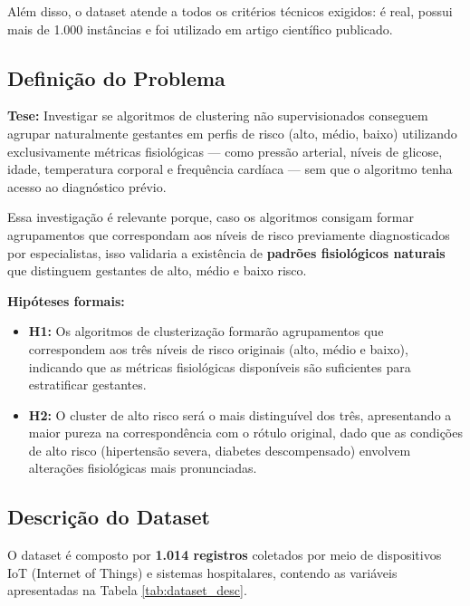 \documentclass[12pt]{article}
\begin{document}
Além disso, o dataset atende a todos os critérios técnicos exigidos: é real, possui mais de 1.000 instâncias e foi utilizado em artigo científico publicado.

\subsection{Definição do Problema}

\textbf{Tese:} Investigar se algoritmos de clustering não supervisionados conseguem agrupar naturalmente gestantes em perfis de risco (alto, médio, baixo) utilizando exclusivamente métricas fisiológicas --- como pressão arterial, níveis de glicose, idade, temperatura corporal e frequência cardíaca --- sem que o algoritmo tenha acesso ao diagnóstico prévio.

Essa investigação é relevante porque, caso os algoritmos consigam formar agrupamentos que correspondam aos níveis de risco previamente diagnosticados por especialistas, isso validaria a existência de \textbf{padrões fisiológicos naturais} que distinguem gestantes de alto, médio e baixo risco.

\textbf{Hipóteses formais:}
\begin{itemize}
    \item \textbf{H1:} Os algoritmos de clusterização formarão agrupamentos que correspondem aos três níveis de risco originais (alto, médio e baixo), indicando que as métricas fisiológicas disponíveis são suficientes para estratificar gestantes.
    \item \textbf{H2:} O cluster de alto risco será o mais distinguível dos três, apresentando a maior pureza na correspondência com o rótulo original, dado que as condições de alto risco (hipertensão severa, diabetes descompensado) envolvem alterações fisiológicas mais pronunciadas.
\end{itemize}

\subsection{Descrição do Dataset}

O dataset é composto por \textbf{1.014 registros} coletados por meio de dispositivos IoT (Internet of Things) e sistemas hospitalares, contendo as variáveis apresentadas na Tabela \ref{tab:dataset_desc}.
\end{document}
